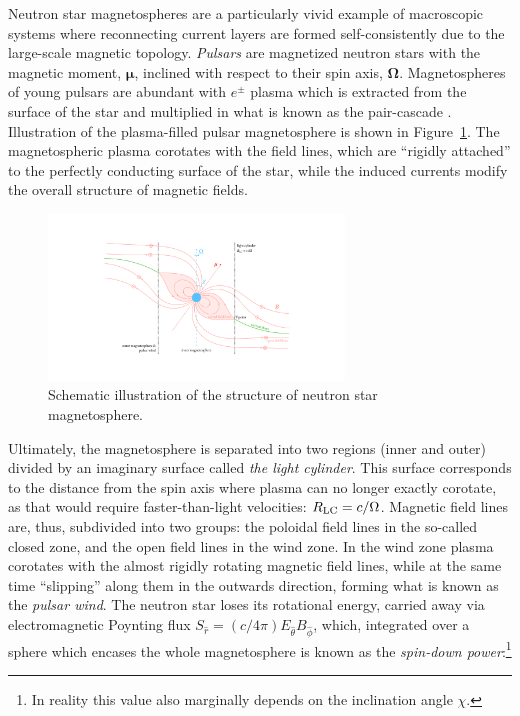 Neutron star magnetospheres are a particularly vivid example of macroscopic systems where reconnecting current layers are formed self-consistently due to the large-scale magnetic topology. \emph{Pulsars} are magnetized neutron stars with the magnetic moment, $\bm{\mu}$, inclined with respect to their spin axis, $\bm{\Omega}$. Magnetospheres of young pulsars are abundant with $e^\pm$ plasma which is extracted from the surface of the star and multiplied in what is known as the pair-cascade  \citep{1969ApJ...157..869G, 1975ApJ...196...51R}. Illustration of the plasma-filled pulsar magnetosphere is shown in Figure~\ref{fig:intro-psr}. The magnetospheric plasma corotates with the field lines, which are ``rigidly attached'' to the perfectly conducting surface of the star, while the induced currents modify the overall structure of magnetic fields.

\begin{figure}[htb]
    \centering
    \includegraphics[width=0.7\textwidth,trim={350 150 350 150},clip]{figures/intro/pulsar_side.pdf}
    \caption{Schematic illustration of the structure of neutron star magnetosphere.}
    \label{fig:intro-psr}
\end{figure}

Ultimately, the magnetosphere is separated into two regions (inner and outer) divided by an imaginary surface called \emph{the light cylinder}. This surface corresponds to the distance from the spin axis where plasma can no longer exactly corotate, as that would require faster-than-light velocities: $R_{\rm LC} = c/\Omega$. Magnetic field lines are, thus, subdivided into two groups: the poloidal field lines in the so-called closed zone, and the open field lines in the wind zone. In the wind zone plasma corotates with the almost rigidly rotating magnetic field lines, while at the same time ``slipping'' along them in the outwards direction, forming what is known as the \emph{pulsar wind}. The neutron star loses its rotational energy, carried away via electromagnetic Poynting flux $S_{\hat{r}} = (c/4\pi) E_{\hat{\theta}}B_{\hat{\phi}}$, which, integrated over a sphere which encases the whole magnetosphere is known as the \emph{spin-down power}:\footnote{In reality this value also marginally depends on the inclination angle $\chi$.}

